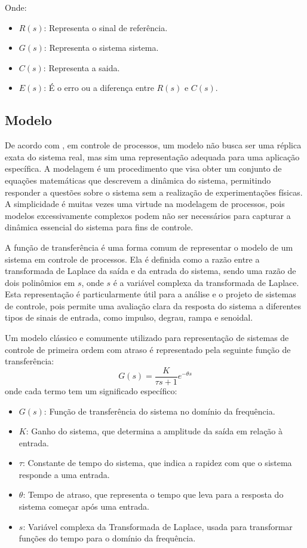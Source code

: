 Onde:
\begin{itemize}
    \item $R(s)$: Representa o sinal de referência.
    \item $G(s)$: Representa o sistema sistema.
    \item $C(s)$: Representa a saida.
    \item $E(s)$: É o erro ou a diferença entre $R(s)$ e $C(s)$.
\end{itemize}

\subsection{Modelo}\label{subsec:modelfund}

De acordo com \cite{CoelhoIdentificacao}, em controle de processos, um modelo não busca ser uma réplica exata do
sistema real, mas sim uma representação adequada para uma aplicação específica.
A modelagem é um procedimento que visa obter um conjunto de equações matemáticas que descrevem a dinâmica do sistema,
permitindo responder a questões sobre o sistema sem a realização de experimentações físicas.
A simplicidade é muitas vezes uma virtude na modelagem de processos, pois modelos excessivamente complexos podem
não ser necessários para capturar a dinâmica essencial do sistema para fins de controle.

A função de transferência é uma forma comum de representar o modelo de um sistema em controle de processos.
Ela é definida como a razão entre a transformada de Laplace da saída e da entrada do sistema,
sendo uma razão de dois polinômios em $s$, onde $s$ é a variável complexa da transformada de Laplace.
Esta representação é particularmente útil para a análise e o projeto de sistemas de controle,
pois permite uma avaliação clara da resposta do sistema a diferentes tipos de sinais de entrada,
como impulso, degrau, rampa e senoidal.

Um modelo clássico e comumente utilizado para representação de sistemas de controle de primeira ordem com atraso é
representado pela seguinte função de transferência:
\begin{equation}
    \label{eq:firstordertf}
    G(s) = \frac{K}{\tau s + 1}e^{-\theta s}
\end{equation}
onde cada termo tem um significado específico:
\begin{itemize}
    \item $G(s)$: Função de transferência do sistema no domínio da frequência.
    \item $K$: Ganho do sistema, que determina a amplitude da saída em relação à entrada.
    \item $\tau$: Constante de tempo do sistema, que indica a rapidez com que o sistema responde a uma entrada.
    \item $\theta$: Tempo de atraso, que representa o tempo que leva para a resposta do sistema começar após uma entrada.
    \item $s$: Variável complexa da Transformada de Laplace, usada para transformar funções do tempo para o domínio da frequência.
\end{itemize}

